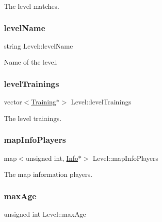 The level matches. 

\hypertarget{class_level_aa59964368a47b0d36ff67948b880b3ef}{}\label{class_level_aa59964368a47b0d36ff67948b880b3ef} 
\subsubsection{\texorpdfstring{level\+Name}{levelName}}
{\footnotesize\ttfamily string Level\+::level\+Name\hspace{0.3cm}{\ttfamily [private]}}



Name of the level. 

\hypertarget{class_level_a887624d3374e9ba74edfeb6a5a38a4b1}{}\label{class_level_a887624d3374e9ba74edfeb6a5a38a4b1} 
\subsubsection{\texorpdfstring{level\+Trainings}{levelTrainings}}
{\footnotesize\ttfamily vector$<$\hyperlink{class_training}{Training}$\ast$$>$ Level\+::level\+Trainings\hspace{0.3cm}{\ttfamily [private]}}



The level trainings. 

\hypertarget{class_level_aea430b89c484e79aebe7f23852ce998c}{}\label{class_level_aea430b89c484e79aebe7f23852ce998c} 
\subsubsection{\texorpdfstring{map\+Info\+Players}{mapInfoPlayers}}
{\footnotesize\ttfamily map$<$unsigned int, \hyperlink{class_info}{Info}$\ast$$>$ Level\+::map\+Info\+Players\hspace{0.3cm}{\ttfamily [private]}}



The map information players. 

\hypertarget{class_level_a009aecf3fb4c0b553680d9e66385a8e2}{}\label{class_level_a009aecf3fb4c0b553680d9e66385a8e2} 
\subsubsection{\texorpdfstring{max\+Age}{maxAge}}
{\footnotesize\ttfamily unsigned int Level\+::max\+Age\hspace{0.3cm}{\ttfamily [private]}}



